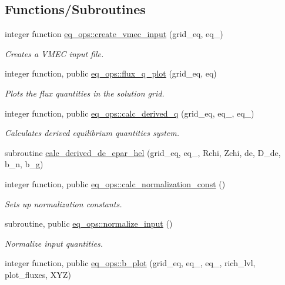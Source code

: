 \subsection*{Functions/\+Subroutines}
\begin{DoxyCompactItemize}
\item 
integer function \hyperlink{namespaceeq__ops_a9addef683b3d4a8c587510e4c994ec61}{eq\+\_\+ops\+::create\+\_\+vmec\+\_\+input} (grid\+\_\+eq, eq\+\_)
\begin{DoxyCompactList}\small\item\em Creates a V\+M\+EC input file. \end{DoxyCompactList}\item 
integer function, public \hyperlink{namespaceeq__ops_af0effe20188d46a44680c2648e4572e9}{eq\+\_\+ops\+::flux\+\_\+q\+\_\+plot} (grid\+\_\+eq, eq)
\begin{DoxyCompactList}\small\item\em Plots the flux quantities in the solution grid. \end{DoxyCompactList}\item 
integer function, public \hyperlink{namespaceeq__ops_a087e08ce6d8ad381b5bac8fc51148d50}{eq\+\_\+ops\+::calc\+\_\+derived\+\_\+q} (grid\+\_\+eq, eq\+\_, eq\+\_)
\begin{DoxyCompactList}\small\item\em Calculates derived equilibrium quantities system. \end{DoxyCompactList}\item 
subroutine \hyperlink{eq__ops_8f90_a369b73b541213d572d7197e0d549c014}{calc\+\_\+derived\+\_\+de\+\_\+epar\+\_\+hel} (grid\+\_\+eq, eq\+\_, Rchi, Zchi, de, D\+\_\+de, b\+\_\+n, b\+\_\+g)
\item 
integer function, public \hyperlink{namespaceeq__ops_a7cd38586e386e1bc684a327ebcc4c1de}{eq\+\_\+ops\+::calc\+\_\+normalization\+\_\+const} ()
\begin{DoxyCompactList}\small\item\em Sets up normalization constants. \end{DoxyCompactList}\item 
subroutine, public \hyperlink{namespaceeq__ops_a1b4c764da73624722d7e76498a2b80a9}{eq\+\_\+ops\+::normalize\+\_\+input} ()
\begin{DoxyCompactList}\small\item\em Normalize input quantities. \end{DoxyCompactList}\item 
integer function, public \hyperlink{namespaceeq__ops_a73a8c3cea1e8a636b4978bc626e0fab0}{eq\+\_\+ops\+::b\+\_\+plot} (grid\+\_\+eq, eq\+\_, eq\+\_, rich\+\_\+lvl, plot\+\_\+fluxes, X\+YZ)

\end{DoxyCompactItemize}
